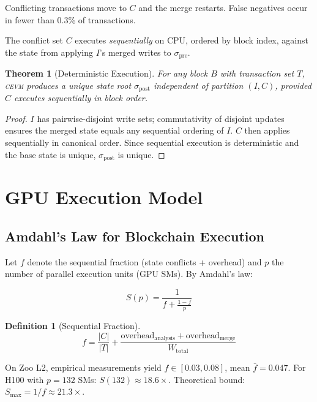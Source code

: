 \documentclass[11pt,letterpaper]{article}
\newtheorem{theorem}{Theorem}
\theoremstyle{definition}
\newtheorem{definition}{Definition}
\theoremstyle{remark}
\newcommand{\cevm}{\textsc{cevm}}
\begin{document}
Conflicting transactions move to $C$ and the merge restarts.
False negatives occur in fewer than 0.3\% of transactions.

The conflict set $C$ executes \emph{sequentially} on CPU, ordered by block index, against the state from applying $I$'s merged writes to $\sigma_{\text{pre}}$.

\begin{theorem}[Deterministic Execution]
\label{thm:deterministic}
For any block $B$ with transaction set $T$, \cevm{} produces a unique state root $\sigma_{\text{post}}$ independent of partition $(I, C)$, provided $C$ executes sequentially in block order.
\end{theorem}

\begin{proof}
$I$ has pairwise-disjoint write sets; commutativity of disjoint updates ensures the merged state equals any sequential ordering of $I$.
$C$ then applies sequentially in canonical order.
Since sequential execution is deterministic and the base state is unique, $\sigma_{\text{post}}$ is unique.
\end{proof}

\section{GPU Execution Model}
\label{sec:gpu-model}

\subsection{Amdahl's Law for Blockchain Execution}

Let $f$ denote the sequential fraction (state conflicts + overhead) and $p$ the number of parallel execution units (GPU SMs).
By Amdahl's law:

\begin{equation}
S(p) = \frac{1}{f + \frac{1-f}{p}}
\label{eq:amdahl}
\end{equation}

\begin{definition}[Sequential Fraction]
\begin{equation}
f = \frac{|C|}{|T|} + \frac{\text{overhead}_{\text{analysis}} + \text{overhead}_{\text{merge}}}{W_{\text{total}}}
\end{equation}
\end{definition}

On Zoo L2, empirical measurements yield $f \in [0.03, 0.08]$, mean $\bar{f} = 0.047$.
For H100 with $p = 132$ SMs: $S(132) \approx 18.6\times$.
Theoretical bound: $S_{\max} = 1/f \approx 21.3\times$.
\end{document}
